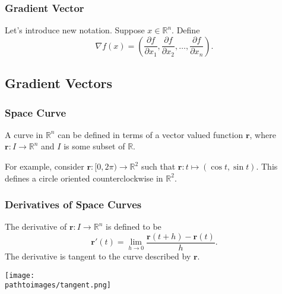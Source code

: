 \documentclass{beamer}
\newcommand{\pathtoimages}{/Users/charlesrambo/Desktop/Bootcamp24/Images}
\begin{document}
\begin{frame}
\frametitle{Gradient Vector}
Let's introduce new notation. Suppose $x\in\mathbb{R}^n$. Define
$$
\nabla f(x) = \left(\frac{\partial f}{\partial x_1}, \frac{\partial f}{\partial x_2},\ldots, \frac{\partial f}{\partial x_n}\right).
$$
\end{frame}

\subsection{Gradient Vectors}
\begin{frame}
\frametitle{Space Curve}
A curve in $\mathbb{R}^n$ can be defined in terms of a vector valued function ${\boldsymbol r}$, where ${\boldsymbol r}:I\to\mathbb{R}^n$ and $I$ is some subset of $\mathbb{R}$. 

For example, consider ${\boldsymbol r}:[0, 2\pi)\to\mathbb{R}^2$ such that ${\boldsymbol r}: t \mapsto \left(\cos t, \sin t\right)$. This defines a circle oriented counterclockwise in $\mathbb{R}^2$.
\begin{center}

\end{center}
\end{frame} 

\begin{frame}[t]
\frametitle{Derivatives of Space Curves}
The derivative of ${\boldsymbol r}:I\to\mathbb{R}^n$ is defined to be
$$
{\boldsymbol r }'(t) =\lim_{h\to 0} \frac{{\boldsymbol r}(t + h) - {\boldsymbol r}(t)}{h}.
$$
The derivative is tangent to the curve described by ${\boldsymbol r}$.
\begin{center}
\texttt{[image: \\pathtoimages/tangent.png]}
\end{center}


\end{frame}
\end{document}
